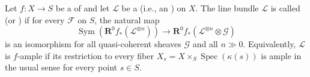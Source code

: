 \begin{definition} \label{definition:relative_ampleness_of_a_line_bundle_on_a_scheme}
    Let $f\colon X \to S$ be a  of  and let $\mathcal{L}$ be a  (i.e., an ) on $X$.
    The line bundle $\mathcal{L}$ is called  (or ) if for every  $\mathcal{F}$ on $S$, the natural map
    $$\operatorname{Sym}(\mathbf{R}^0 f_* (\mathcal{L}^{\otimes n})) \to \mathbf{R}^0 f_* (\mathcal{L}^{\otimes n} \otimes \mathcal{G})$$
    is an isomorphism for all quasi-coherent sheaves $\mathcal{G}$ and all $n \gg 0$. Equivalently, $\mathcal{L}$ is $f$-ample if its restriction to every fiber $X_s = X \times_S \operatorname{Spec}(\kappa(s))$ is ample in the usual sense for every point $s \in S$.
\end{definition}
